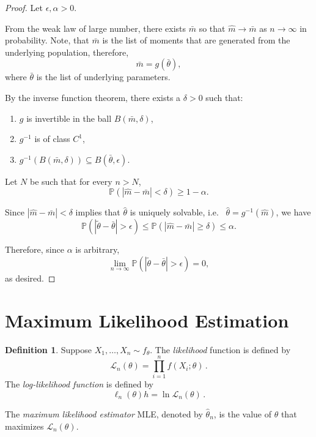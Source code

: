 \documentclass[
  openany]{book}
\theoremstyle{definition}
\newtheorem{definition}{Definition}[chapter]
\theoremstyle{definition}
\theoremstyle{definition}
\theoremstyle{definition}
\theoremstyle{remark}
\begin{document}
\begin{proof}
Let \(\epsilon, \alpha >0\).

From the weak law of large number, there exists \(\bar m\) so that \(\hat m \to \bar m\)
as \(n \to \infty\) in probability.
Note, that \(\bar m\) is the list of moments that are generated from the underlying
population, therefore,
\[\bar m = g (\bar \theta),\]
where \(\bar\theta\) is the list of underlying parameters.

By the inverse function theorem, there exists a \(\delta >0\) such that:

\begin{enumerate}
\def\labelenumi{\arabic{enumi}.}
\item
  \(g\) is invertible in the ball \(B(\bar m, \delta)\),
\item
  \(g^{-1}\) is of class \(C^1\),
\item
  \(g^{-1}(B(\bar m, \delta)) \subseteq B(\bar \theta, \epsilon)\).
\end{enumerate}

Let \(N\) be such that for every \(n > N\),
\[\mathbb{P}( |\hat m - \bar m| < \delta) \geq 1 - \alpha. \]

Since \(|\hat m - \bar m| < \delta\) implies that \(\hat\theta\) is uniquely solvable, i.e.~
\(\hat\theta = g^{-1}(\hat m)\),
we have
\[ \mathbb{P}(| \tilde \theta - \bar \theta | > \epsilon) \leq \mathbb{P}( |\hat m - \bar m| \geq \delta) \leq \alpha. \]

Therefore, since \(\alpha\) is arbitrary,
\[\lim_{n\to \infty}\mathbb{P}( |\tilde \theta - \bar \theta| > \epsilon ) = 0,\]
as desired.
\end{proof}

\section{Maximum Likelihood Estimation}\label{maximum-likelihood-estimation}

\begin{definition}
Suppose \(X_1, \dots, X_n \sim f_\theta\).
The \emph{likelihood} function is defined by
\[ \mathcal{L}_n(\theta) = \prod_{i = 1}^n f (X_i; \theta) \,. \]
The \emph{log-likelihood function} is defined by
\[ \ell_n (\theta) h = \ln \mathcal{L}_n (\theta) \,. \]

The \emph{maximum likelihood estimator} MLE, denoted by \(\hat \theta_n\), is the value of
\(\theta\) that maximizes \(\mathcal{L}_n(\theta)\).
\end{definition}
\end{document}
